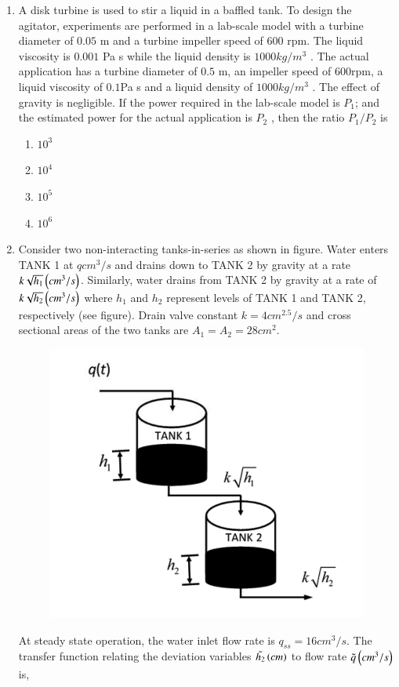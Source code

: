 \documentclass[journal]{IEEEtran}
\begin{document}
\begin{enumerate}
    \item A disk turbine is used to stir a liquid in a baffled tank. To design the agitator, experiments are performed in a lab-scale model with a turbine diameter of $0.05$ m and a turbine impeller speed of $600$ rpm. The liquid viscosity is $0.001$ Pa s while the liquid density is $1000 kg/m^3$ . The actual application has a turbine diameter of $0.5$ m, an impeller speed of $600$rpm, a liquid viscosity of $0.1$Pa s and a liquid density of $1000 kg/m^3$ . The effect of gravity is negligible. If the power required in the lab-scale model is $P_1$; and the estimated power for the actual application is $P_2$ , then the ratio $P_1/P_2$ is 
\begin{multicols}{4}
    \begin{enumerate}
        \item $10^3$
        \item $10^4$
        \item $10^5$
        \item $10^6$
        \end{enumerate}
\end{multicols}
\newpage
    \item Consider two non-interacting tanks-in-series as shown in figure. Water enters TANK 1 at $q cm^3/s$ and drains down to TANK 2 by gravity at a rate $k\sqrt{h_1}\left(cm^3/s\right)$. Similarly, water drains from TANK 2 by gravity at a rate of $k\sqrt{h_2}\left(cm^3/s\right)$ where $h_1$ and $h_2$ represent levels of TANK 1 and TANK 2, respectively (see figure). Drain valve constant $k = 4 cm^{2.5}/s$ and cross sectional areas of the two tanks are $A_1 = A_2 = 28 cm^2$.

\begin{figure}[h!]
    \centering
    \includegraphics[width=0.4\linewidth]{Fig/30.png}
  
\end{figure}

    At steady state operation, the water inlet flow rate is $q_{ss} = 16 cm^3/s$. The transfer function relating the deviation variables $\tilde{h_2}\left(cm\right)$ to flow rate $\tilde{q}\left(cm^3/s\right)$ is,


\end{enumerate}
\end{document}
